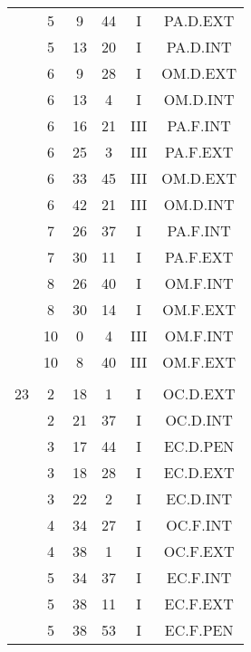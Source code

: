 \documentclass[12pt, a4paper]{article}
\begin{document}
\begin{multicols}{3}
{\begin{tabular}{c c c c c c}
	 	 	 	 & 5 & 9 & 44 & I & PA.D.EXT\\%
	 	 	 	 & 5 & 13 & 20 & I & PA.D.INT\\%
	 	 	 	 & 6 & 9 & 28 & I & OM.D.EXT\\%
	 	 	 	 & 6 & 13 & 4 & I & OM.D.INT\\%
	 	 	 	 & 6 & 16 & 21 & III & PA.F.INT\\%
	 	 	 	 & 6 & 25 & 3 & III & PA.F.EXT\\%
	 	 	 	 & 6 & 33 & 45 & III & OM.D.EXT\\%
	 	 	 	 & 6 & 42 & 21 & III & OM.D.INT\\%
	 	 	 	 & 7 & 26 & 37 & I & PA.F.INT\\%
	 	 	 	 & 7 & 30 & 11 & I & PA.F.EXT\\%
	 	 	 	 & 8 & 26 & 40 & I & OM.F.INT\\%
	 	 	 	 & 8 & 30 & 14 & I & OM.F.EXT\\%
	 	 	 	 & 10 & 0 & 4 & III & OM.F.INT\\%
	 	 	 	 & 10 & 8 & 40 & III & OM.F.EXT\\%
	 	 	 	 & & & & & \\%
	 	 	 	23 & 2 & 18 & 1 & I & OC.D.EXT\\%
	 	 	 	 & 2 & 21 & 37 & I & OC.D.INT\\%
	 	 	 	 & 3 & 17 & 44 & I & EC.D.PEN\\%
	 	 	 	 & 3 & 18 & 28 & I & EC.D.EXT\\%
	 	 	 	 & 3 & 22 & 2 & I & EC.D.INT\\%
	 	 	 	 & 4 & 34 & 27 & I & OC.F.INT\\%
	 	 	 	 & 4 & 38 & 1 & I & OC.F.EXT\\%
	 	 	 	 & 5 & 34 & 37 & I & EC.F.INT\\%
	 	 	 	 & 5 & 38 & 11 & I & EC.F.EXT\\%
	 	 	 	 & 5 & 38 & 53 & I & EC.F.PEN\\%
	 	 \end{tabular}
 	}
\end{multicols}
\end{document}
